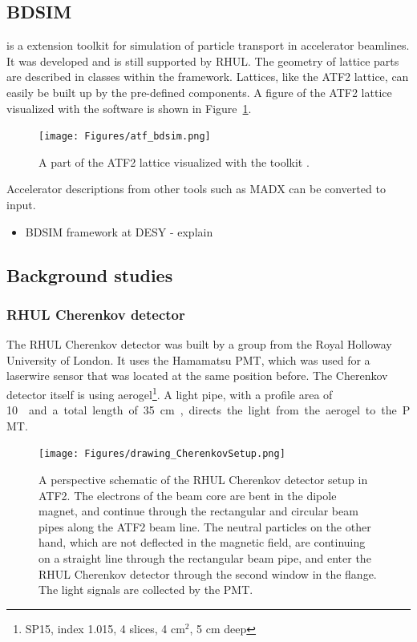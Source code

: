 \subsection{BDSIM}
\label{BDSIM}
\bdsim is a \geant extension toolkit for simulation of particle transport in accelerator beamlines. It was developed and is still supported by RHUL.
The geometry of lattice parts are described in classes within the \bdsim framework. Lattices, like the ATF2 lattice, can easily be built up by the pre-defined components. A figure of the ATF2 lattice visualized with the \bdsim software is shown in Figure~\ref{fig:ATF2_BDSIM}.
\begin{figure}
\centering
\texttt{[image: Figures/atf\_bdsim.png]} %
\caption[ATF2 lattice in \bdsim]{A part of the ATF2 lattice visualized with the \geant toolkit \bdsim.}
\label{fig:ATF2_BDSIM}
\end{figure}
Accelerator descriptions from other tools such as MADX can be converted to \bdsim input. 

\begin{itemize}
 \item BDSIM framework at DESY - explain
\end{itemize}

\subsection{Background studies}
\subsubsection{RHUL Cherenkov detector}
\label{RHUL}

The RHUL Cherenkov detector was built by a group from the Royal Holloway University of London. It uses the Hamamatsu PMT, which was used for a laserwire sensor that was located at the same position before. The Cherenkov detector itself is using aerogel\footnote{SP15, index 1.015, 4 slices, 4 cm$^2$, 5 cm deep}. A light pipe, with a profile area of \SI{10}{\centi\metre\square} and a total length of \SI{35}{\centi\metre}, directs the light from the aerogel to the PMT.

\begin{figure}
\centering
\texttt{[image: Figures/drawing\_CherenkovSetup.png]}
\caption[Schematic drawing of the RHUL Cherenkov detector setup]{A perspective schematic of the RHUL Cherenkov detector setup in ATF2. The electrons of the beam core are bent in the dipole magnet, and continue through the rectangular and circular beam pipes along the ATF2 beam line. The neutral particles on the other hand, which are not deflected in the magnetic field, are continuing on a straight line through the rectangular beam pipe, and enter the RHUL Cherenkov detector through the second window in the flange. The light signals are collected by the PMT.}
\label{fig:RHUL_Cherenkov_Drawing}
\end{figure}

